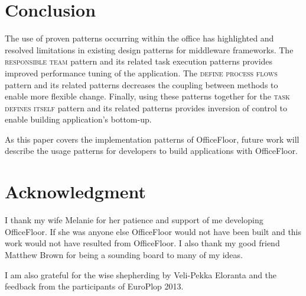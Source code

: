 \documentclass[prodmode]{style/acmlarge}
\begin{document}
\section{Conclusion}

The use of proven patterns occurring within the office has highlighted and
resolved limitations in existing design patterns for middleware frameworks.  The
\textsc{responsible team} pattern and its related task execution patterns
provides improved performance tuning of the application.  The \textsc{define
process flows} pattern and its related patterns decreases the coupling between
methods to enable more flexible change.  Finally, using these patterns together
for the \textsc{task defines itself} pattern and its related patterns provides
inversion of control to enable building application's bottom-up.

As this paper covers the implementation patterns of OfficeFloor, future work
will describe the usage patterns for developers to build applications with
OfficeFloor.



\section*{Acknowledgment} 

I thank my wife Melanie for her patience and support of me developing
OfficeFloor.  If she was anyone else OfficeFloor would not have been built and
this work would not have resulted from OfficeFloor.  I also thank my good friend
Matthew Brown for being a sounding board to many of my ideas.

I am also grateful for the wise shepherding by Veli-Pekka Eloranta and the
feedback from the participants of EuroPlop 2013.




\end{document}
